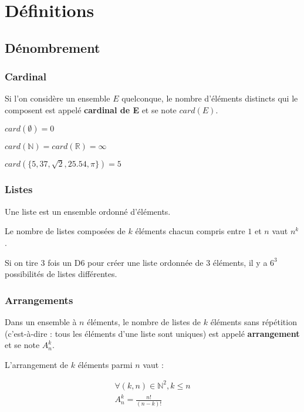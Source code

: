 \chapter{Définitions}
\label{Chapter01}

\section{Dénombrement}

\subsection{Cardinal}

Si l'on considère un ensemble $E$ quelconque, le nombre d'éléments distincts qui le composent est appelé \textbf{cardinal de E} et se note $card(E)$.

\begin{example}
    $card(\emptyset) = 0$

    $card(\mathbb{N}) = card(\mathbb{R}) = \infty$

    $card( \{5, 37, \sqrt{2}, 25.54, \pi\} ) = 5$
\end{example}

\subsection{Listes}

Une liste est un ensemble ordonné d'éléments.

\begin{definition}
    Le nombre de listes composées de $k$ éléments chacun compris entre $1$ et $n$ vaut $n^k$.
\end{definition}
\begin{example}
    Si on tire 3 fois un D6 pour créer une liste ordonnée de 3 éléments, il y a $6^3$ possibilités de listes différentes.
\end{example}

\subsection{Arrangements}

Dans un ensemble à $n$ éléments, le nombre de listes de $k$ éléments sans répétition (c'est-à-dire : tous les éléments d'une liste sont uniques) est appelé \textbf{arrangement} et se note $A^k_n$.

\begin{definition}
    L'arrangement de $k$ éléments parmi $n$ vaut :

    \begin{equation*}
        \begin{split}
            \forall (k,n) \in \mathbb{N}^2, k \le n \\
            A^k_n = \frac{n!}{(n-k)!}
        \end{split}
    \end{equation*}
\end{definition}

